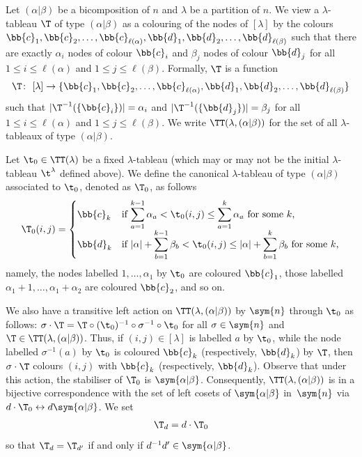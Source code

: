 Let $(\alpha|\beta)$ be a bicomposition of $n$ and $\lambda$ be a partition of $n$. We view a $\lambda$-tableau $\T$ of type $(\alpha|\beta)$ as a colouring of the nodes of $[\lambda]$ by the colours $\bb{c}_1,\bb{c}_2,\dotsc, \bb{c}_{\ell(\alpha)},\bb{d}_1,\bb{d}_2,\dotsc,\bb{d}_{\ell(\beta)}$ such that there are exactly $\alpha_i$ nodes of colour $\bb{c}_i$ and $\beta_j$ nodes of colour $\bb{d}_j$ for all $1 \leq i\leq \ell(\alpha)$ and $1\leq j\leq \ell(\beta)$. Formally, $\T$ is a function \begin{gather*}\T\colon \ [\lambda]\to \{\bb{c}_1,\bb{c}_2,\dotsc, \bb{c}_{\ell(\alpha)},\bb{d}_1,\bb{d}_2,\dotsc,\bb{d}_{\ell(\beta)} \}\end{gather*} such that $|\T^{-1}(\{\bb{c}_i\})|=\alpha_i$ and $|\T^{-1}(\{\bb{d}_j\})|=\beta_j$ for all $1 \leq i\leq \ell(\alpha)$ and $1\leq j\leq \ell(\beta)$. We write $\TT(\lambda, (\alpha|\beta))$ for the set of all $\lambda$-tableaux of type $(\alpha|\beta)$.

Let $\t_0 \in \TT(\lambda)$ be a fixed $\lambda$-tableau (which may or may not be the initial $\lambda$-tableau $\t^{\lambda}$ defined above). We define the canonical $\lambda$-tableau of type $(\alpha|\beta)$ associated to $\t_0$, denoted as $\T_0$, as follows
\begin{gather*}
\T_0(i,j) = \begin{cases}\bb{c}_k&\text{if $\displaystyle{\sum^{k-1}_{a=1} \alpha_a < \t_0(i,j) \leq \sum^{k}_{a=1} \alpha_a}$ for some $k$,}\\ \bb{d}_k&\text{if $\displaystyle{|\alpha|+\sum^{k-1}_{b=1} \beta_b < \t_0(i,j) \leq |\alpha|+\sum^{k}_{b=1} \beta_b}$ for some $k$,}\end{cases} \end{gather*} namely, the nodes labelled $1,\ldots,\alpha_1$ by $\t_0$ are coloured $\bb{c}_1$, those labelled $\alpha_1 + 1,\dotsc, \alpha_1 + \alpha_2$ are coloured $\bb{c}_2$, and so on.

We also have a transitive left action on $\TT(\lambda, (\alpha|\beta))$ by $\sym{n}$ through $\t_0$ as follows: $\sigma \cdot \T = \T \circ (\t_0)^{-1} \circ \sigma^{-1} \circ \t_0$ for all $\sigma \in \sym{n}$ and $\T \in \TT(\lambda,(\alpha|\beta))$. Thus, if $(i,j) \in [\lambda]$ is labelled $a$ by $\t_0$, while the node labelled $\sigma^{-1}(a)$ by $\t_0$ is coloured $\bb{c}_k$ (respectively, $\bb{d}_k$) by $\T$, then $\sigma \cdot \T$ colours $(i,j)$ with $\bb{c}_k$ (respectively, $\bb{d}_k$). Observe that under this action, the stabiliser of $\T_0$ is $\sym{\alpha|\beta}$. Consequently, $\TT(\lambda, (\alpha|\beta))$ is in a bijective correspondence with the set of left cosets of $\sym{\alpha|\beta}$ in~$\sym{n}$ via $d \cdot \T_0 \leftrightarrow d \sym{\alpha|\beta}$. We set \begin{gather*}\T_d=d\cdot \T_0\end{gather*} so that $\T_d=\T_{d'}$ if and only if $d^{-1}d'\in\sym{\alpha|\beta}$.

